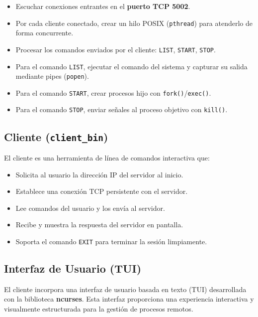 \documentclass[12pt,a4paper]{report}
\begin{document}
\begin{itemize}[leftmargin=1.5em]
  \item Escuchar conexiones entrantes en el \textbf{puerto TCP 5002}.
  \item Por cada cliente conectado, crear un hilo POSIX (\texttt{pthread}) para atenderlo de forma concurrente.
  \item Procesar los comandos enviados por el cliente: \texttt{LIST}, \texttt{START}, \texttt{STOP}.
  \item Para el comando \texttt{LIST}, ejecutar el comando del sistema y capturar su salida mediante pipes (\texttt{popen}).
  \item Para el comando \texttt{START}, crear procesos hijo con \texttt{fork()}/\texttt{exec()}.
  \item Para el comando \texttt{STOP}, enviar señales al proceso objetivo con \texttt{kill()}.
\end{itemize}

\subsection{Cliente (\texttt{client\_bin})}

El cliente es una herramienta de línea de comandos interactiva que:

\begin{itemize}[leftmargin=1.5em]
  \item Solicita al usuario la dirección IP del servidor al inicio.
  \item Establece una conexión TCP persistente con el servidor.
  \item Lee comandos del usuario y los envía al servidor.
  \item Recibe y muestra la respuesta del servidor en pantalla.
  \item Soporta el comando \texttt{EXIT} para terminar la sesión limpiamente.
\end{itemize}

\subsection{Interfaz de Usuario (TUI)}

El cliente incorpora una interfaz de usuario basada en texto (TUI) desarrollada con la biblioteca \textbf{ncurses}. Esta interfaz proporciona una experiencia interactiva y visualmente estructurada para la gestión de procesos remotos.
\end{document}
